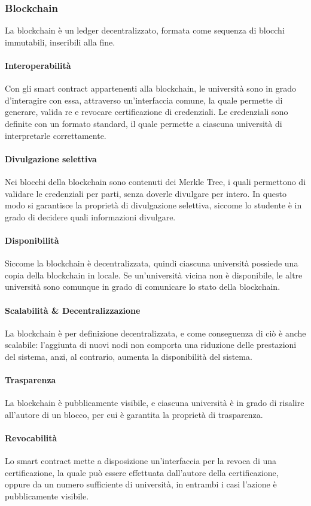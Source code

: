 \documentclass[a4paper,12pt]{article}
\begin{document}
\subsubsection{Blockchain}
La blockchain è un ledger decentralizzato, formata come sequenza di blocchi immutabili, inseribili alla fine.
\paragraph{Interoperabilità} 
Con gli smart contract appartenenti alla blockchain, le università sono in grado d'interagire con essa, attraverso un'interfaccia comune, la quale permette di generare, valida re e revocare certificazione di credenziali. 
Le credenziali sono definite con un formato standard, il quale permette a ciascuna università di interpretarle correttamente.
\paragraph{Divulgazione selettiva}
Nei blocchi della blockchain sono contenuti dei Merkle Tree, i quali permettono di validare le credenziali per parti, senza doverle divulgare per intero. In questo modo si garantisce la proprietà di divulgazione selettiva, siccome lo studente è in grado di decidere quali informazioni divulgare.
\paragraph{Disponibilità}
Siccome la blockchain è decentralizzata, quindi ciascuna università possiede una copia della blockchain in locale. Se un'università vicina non è disponibile, le altre università sono comunque in grado di comunicare lo stato della blockchain.
\paragraph{Scalabilità \& Decentralizzazione}
La blockchain è per definizione decentralizzata, e come conseguenza di ciò è anche scalabile: l'aggiunta di nuovi nodi non comporta una riduzione delle prestazioni del sistema, anzi, al contrario, aumenta la disponibilità del sistema. 
\paragraph{Trasparenza}
La blockchain è pubblicamente visibile, e ciascuna università è in grado di risalire all'autore di un blocco, per cui è garantita la proprietà di trasparenza.
\paragraph{Revocabilità}
Lo smart contract mette a disposizione un'interfaccia per la revoca di una certificazione, la quale può essere effettuata dall'autore della certificazione, oppure da un numero sufficiente di università, in entrambi i casi l'azione è pubblicamente visibile.
\end{document}
